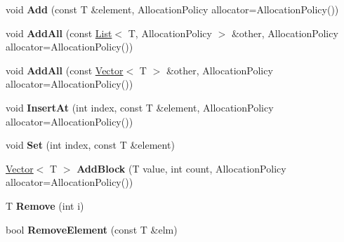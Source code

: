 \begin{DoxyCompactItemize}
\item 
\hypertarget{classv8_1_1internal_1_1_list_a18b8264c716e34018e8813be890c1cab}{}void {\bfseries Add} (const T \&element, Allocation\+Policy allocator=Allocation\+Policy())\label{classv8_1_1internal_1_1_list_a18b8264c716e34018e8813be890c1cab}

\item 
\hypertarget{classv8_1_1internal_1_1_list_ab352e95794a628d45af7db424303ec6b}{}void {\bfseries Add\+All} (const \hyperlink{classv8_1_1internal_1_1_list}{List}$<$ T, Allocation\+Policy $>$ \&other, Allocation\+Policy allocator=Allocation\+Policy())\label{classv8_1_1internal_1_1_list_ab352e95794a628d45af7db424303ec6b}

\item 
\hypertarget{classv8_1_1internal_1_1_list_a549c0a1f12fb89f1ff9e7e00058912ce}{}void {\bfseries Add\+All} (const \hyperlink{classv8_1_1internal_1_1_vector}{Vector}$<$ T $>$ \&other, Allocation\+Policy allocator=Allocation\+Policy())\label{classv8_1_1internal_1_1_list_a549c0a1f12fb89f1ff9e7e00058912ce}

\item 
\hypertarget{classv8_1_1internal_1_1_list_a840c1617f33eedc78b6e9d088b9aa08a}{}void {\bfseries Insert\+At} (int index, const T \&element, Allocation\+Policy allocator=Allocation\+Policy())\label{classv8_1_1internal_1_1_list_a840c1617f33eedc78b6e9d088b9aa08a}

\item 
\hypertarget{classv8_1_1internal_1_1_list_a1eee3d0d76fda21a6a6b9007ffd7209c}{}void {\bfseries Set} (int index, const T \&element)\label{classv8_1_1internal_1_1_list_a1eee3d0d76fda21a6a6b9007ffd7209c}

\item 
\hypertarget{classv8_1_1internal_1_1_list_aa5339d7dd2ebe2e4917db71f65a422fc}{}\hyperlink{classv8_1_1internal_1_1_vector}{Vector}$<$ T $>$ {\bfseries Add\+Block} (T value, int count, Allocation\+Policy allocator=Allocation\+Policy())\label{classv8_1_1internal_1_1_list_aa5339d7dd2ebe2e4917db71f65a422fc}

\item 
\hypertarget{classv8_1_1internal_1_1_list_a67f1d50f50f87183c7a3864bcbc2e0db}{}T {\bfseries Remove} (int i)\label{classv8_1_1internal_1_1_list_a67f1d50f50f87183c7a3864bcbc2e0db}

\item 
\hypertarget{classv8_1_1internal_1_1_list_a301b954cd7954452fca522c542f2d69a}{}bool {\bfseries Remove\+Element} (const T \&elm)\label{classv8_1_1internal_1_1_list_a301b954cd7954452fca522c542f2d69a}


\end{DoxyCompactItemize}

